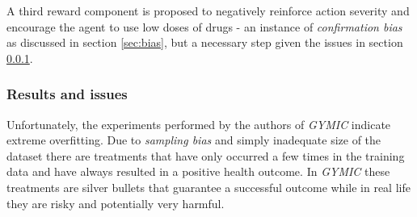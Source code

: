 A third reward component is proposed to negatively reinforce action severity and encourage the agent to use low doses of drugs - an instance of \emph{confirmation bias} as discussed in section \ref{sec:bias}, but a necessary step given the issues in section \ref{sec:gymic-results}.

\subsubsection{Results and issues}
\label{sec:gymic-results}

Unfortunately, the experiments performed by the authors of \emph{GYMIC} indicate extreme overfitting.
Due to \emph{sampling bias} and simply inadequate size of the dataset there are treatments that have only occurred a few times in the training data and have always resulted in a positive health outcome.
In \emph{GYMIC} these treatments are silver bullets that guarantee a successful outcome while in real life they are risky and potentially very harmful.